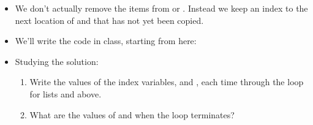 \documentclass[letterpaper,10pt,english]{sphinxmanual}
\begin{document}
\begin{itemize}
\begin{itemize}
\end{itemize}

\item {} 
We don’t actually remove the items from  or . Instead we
keep an index to the next location of  and  that has not
yet been copied.

\item {} 
We’ll write the code in class, starting from here:

\begin{sphinxVerbatim}[commandchars=\\\{\}]
  
      
      
      \PYG{p}{[}\PYG{p}{]}












     
\end{sphinxVerbatim}

\item {} 
Studying the solution:
\begin{enumerate}
\def\theenumi{\arabic{enumi}}
\def\labelenumi{\theenumi .}
\makeatletter\def\p@enumii{\p@enumi \theenumi .}\makeatother
\item {} 
Write the values of the index variables,  and , each
time through the loop for lists  and  above.

\item {} 
What are the values of  and  when the loop terminates?

\end{enumerate}

\end{itemize}
\end{document}
